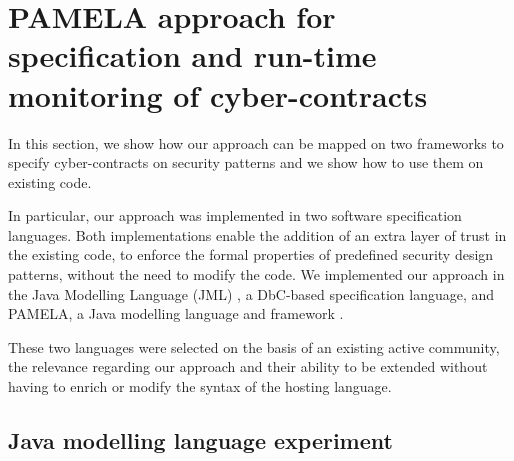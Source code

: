 
\section{PAMELA approach for specification and run-time monitoring of cyber-contracts}

\cite{guerin:hal-03217126}

\cite{silva:hal-02958111}

In this section, we show how our approach can be mapped on two frameworks to specify cyber-contracts on security patterns and we show how to use them on existing code.

In particular, our approach was implemented in two software specification languages. Both implementations enable the addition of an extra layer of trust in the existing code, to enforce the formal properties of predefined security design patterns, without the need to modify the code. We implemented our approach in the Java Modelling Language (JML) \cite{leavens2006}, a DbC-based specification language, and PAMELA, a Java modelling language and framework \cite{PAMELAWebSite}.

These two languages were selected on the basis of an existing active community, the relevance regarding our approach and their ability to be extended without having to enrich or modify the syntax of the hosting language.

\subsection{Java modelling language experiment}

